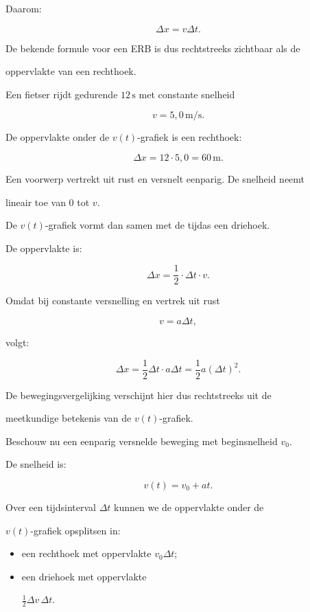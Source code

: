 \documentclass{ximera}
\begin{document}
Daarom:

\[\Delta x=v\Delta t.\]

De bekende formule voor een ERB is dus rechtstreeks zichtbaar als de

oppervlakte van een rechthoek.

\begin{voorbeeld}

Een fietser rijdt gedurende $12\,\mathrm{s}$ met constante snelheid

\[v=5,0\,\mathrm{m/s}.\]

De oppervlakte onder de $v(t)$-grafiek is een rechthoek:

\[\Delta x = 12\cdot5,0 = 60\,\mathrm{m}.\]

\end{voorbeeld}


Een voorwerp vertrekt uit rust en versnelt eenparig. De snelheid neemt

lineair toe van $0$ tot $v$.

De $v(t)$-grafiek vormt dan samen met de tijdas een driehoek.

De oppervlakte is:

\[\Delta x = \frac12\cdot\Delta t\cdot v.\]

Omdat bij constante versnelling en vertrek uit rust

\[v=a\Delta t,\]

volgt:

\[\Delta x = \frac12\Delta t\cdot a\Delta t = \boxed{\frac12a(\Delta t)^2}.\]

De bewegingsvergelijking verschijnt hier dus rechtstreeks uit de

meetkundige betekenis van de $v(t)$-grafiek.


Beschouw nu een eenparig versnelde beweging met beginsnelheid $v_0$.

De snelheid is:

\[v(t)=v_0+at.\]

Over een tijdsinterval $\Delta t$ kunnen we de oppervlakte onder de

$v(t)$-grafiek opsplitsen in:

\begin{itemize}

 \item een rechthoek met oppervlakte $v_0\Delta t$;

 \item een driehoek met oppervlakte

    $\frac12\Delta v\,\Delta t$.

\end{itemize}
\end{document}
